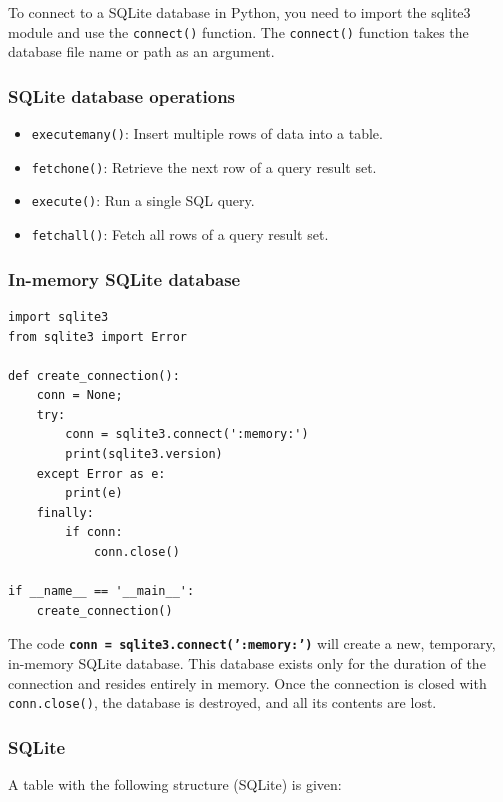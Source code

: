 To connect to a SQLite database in Python, you need to import the sqlite3 module and use the \texttt{connect()} function. The \texttt{connect()} function takes the database file name or path as an argument.

\subsubsection{SQLite database operations}
\begin{itemize}
    \item \texttt{executemany()}: Insert multiple rows of data into a table.
    
    \item \texttt{fetchone()}: Retrieve the next row of a query result set.
    
    \item \texttt{execute()}: Run a single SQL query.
    
    \item \texttt{fetchall()}: Fetch all rows of a query result set.
\end{itemize}

\newpage
\subsubsection{In-memory SQLite database}
\begin{codebox}
\begin{verbatim}
import sqlite3
from sqlite3 import Error
 
def create_connection():
    conn = None;
    try:
        conn = sqlite3.connect(':memory:')       
        print(sqlite3.version)
    except Error as e:
        print(e)
    finally:
        if conn:
            conn.close()
 
if __name__ == '__main__':
    create_connection()
\end{verbatim}
\end{codebox}

The code \textbf{\texttt{conn = sqlite3.connect(':memory:')}} will create a new, temporary, in-memory SQLite database. This database exists only for the duration of the connection and resides entirely in memory. Once the connection is closed with \texttt{conn.close()}, the database is destroyed, and all its contents are lost.

\subsubsection{SQLite}
A table with the following structure (SQLite) is given:

